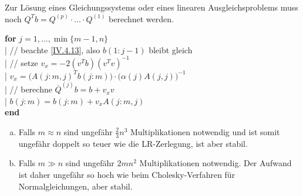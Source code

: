 Zur Lösung eines Gleichungssystems oder eines linearen Ausgleichsproblems
muss noch $Q^Tb=Q^{(p)}\cdot \dots \cdot Q^{(1)}$ berechnet werden.

\begin{pseudocode}{0.7\linewidth}
  \textbf{for} $j=1,\dots, \min\{m-1,n\}$\\
  |	\> // beachte \eqref{IV.4.13}, also $b(1:j-1)$ bleibt gleich\\
  |	\> // setze $v_x=-2(v^Tb)(v^Tv)^{-1}$\\
  |	\> $v_x=\big(A(j:m,j)^Tb(j:m)\big)\cdot \big(\alpha(j)A(j,j)\big)^{-1}$ \\
  |	\> // berechne $\overline{Q}^{(j)} b=b+v_xv$\\
  |	\> $b(j:m) = b(j:m)+v_xA(j:m,j)$\\
  \textbf{end}
\end{pseudocode}


\begin{enumerate}[a)]
\item Falls $m\approx n$ sind ungefähr $\frac{2}{3}n^3$ Multiplikationen notwendig
  und ist somit ungefähr doppelt so teuer wie die LR-Zerlegung, ist aber stabil.
\item Falls $m\gg n$ sind ungefähr $2mn^2$ Multiplikationen notwendig.
  Der Aufwand ist daher ungefähr so hoch wie beim Cholesky-Verfahren für Normalgleichungen,
  aber stabil.
\end{enumerate}

